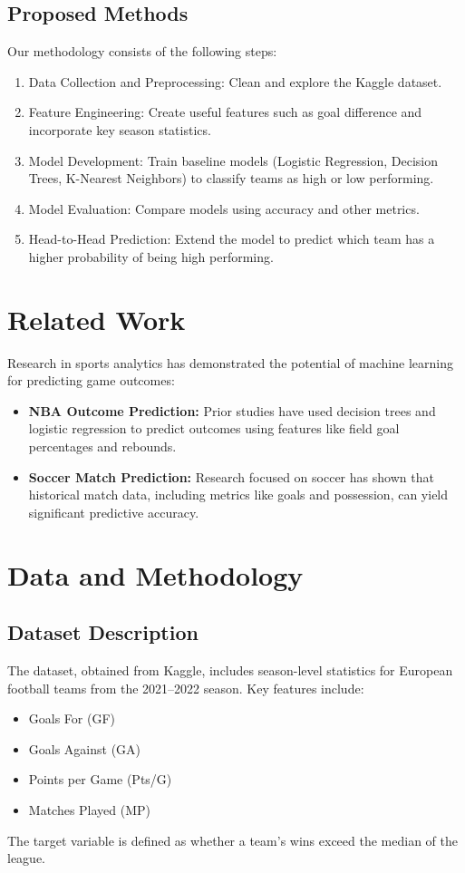 \documentclass[a4paper,12pt]{article}
\begin{document}
\subsection{Proposed Methods}
Our methodology consists of the following steps:
\begin{enumerate}
    \item Data Collection and Preprocessing: Clean and explore the Kaggle dataset.
    \item Feature Engineering: Create useful features such as goal difference and incorporate key season statistics.
    \item Model Development: Train baseline models (Logistic Regression, Decision Trees, K-Nearest Neighbors) to classify teams as high or low performing.
    \item Model Evaluation: Compare models using accuracy and other metrics.
    \item Head-to-Head Prediction: Extend the model to predict which team has a higher probability of being high performing.
\end{enumerate}

\section{Related Work}
Research in sports analytics has demonstrated the potential of machine learning for predicting game outcomes:
\begin{itemize}
    \item \textbf{NBA Outcome Prediction:} Prior studies have used decision trees and logistic regression to predict outcomes using features like field goal percentages and rebounds.
    \item \textbf{Soccer Match Prediction:} Research focused on soccer has shown that historical match data, including metrics like goals and possession, can yield significant predictive accuracy.
\end{itemize}

\section{Data and Methodology}
\subsection{Dataset Description}
The dataset, obtained from Kaggle, includes season-level statistics for European football teams from the 2021--2022 season. Key features include:
\begin{itemize}
    \item Goals For (GF)
    \item Goals Against (GA)
    \item Points per Game (Pts/G)
    \item Matches Played (MP)
\end{itemize}
The target variable is defined as whether a team's wins exceed the median of the league.
\end{document}
